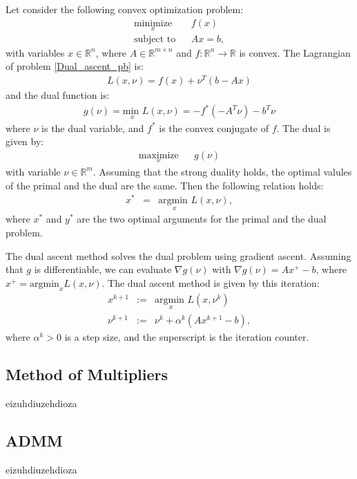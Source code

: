 \documentclass{article}
\begin{document}
	Let consider the following convex optimization problem:
\begin{eqnarray}
\label{Dual_ascent_pb}
\underset{x}{\text{minimize}} & & f(x) \\
\text{subject to} & & Ax = b, \nonumber
\end{eqnarray}
with variables $x \in \mathbb{R}^n$, where $A \in \mathbb{R}^{m \times n}$ and $ f : \mathbb{R}^n \to \mathbb{R}$ is convex. 
The Lagrangian of problem \ref{Dual_ascent_pb} is:
\begin{eqnarray*}
\label{Dual_ascent_Lag}
L(x,\nu) = f(x) + \nu^T (b - Ax)
\end{eqnarray*}
and the dual function is:
\begin{eqnarray*}
g(\nu) = \underset{x}{\text{min }} L(x, \nu) = - f^{*}(-A^T \nu) - b^T \nu
\end{eqnarray*}
where $\nu $ is the dual variable, and $f^*$ is the convex conjugate of $f$. The dual is given by:
\begin{eqnarray*}
\underset{\nu}{\text{maximize}} & & g(\nu)
\end{eqnarray*}
with variable $\nu \in \mathbb{R}^m$. Assuming that the strong duality holds, the optimal valules of the primal and the dual are the same. Then the following relation holds:
\begin{eqnarray*}
x^* &=& \underset{x}{\text{argmin }} L(x, \nu),
\end{eqnarray*}
where $x^*$ and $y^*$ are the two optimal arguments for the primal and the dual problem.

The dual ascent method solves the dual problem using gradient ascent. Assuming that $g$ is differentiable, we can evaluate $\nabla g(\nu)$ with $\nabla g(\nu) = Ax^+ - b$, where $x^+ = \text{argmin}_x L(x, \nu)$. The dual ascent method is given by this iteration:
\begin{eqnarray*}
x^{k+1} &:=& \underset{x}{\text{argmin }} L(x, \nu^k) \\
\nu^{k+1} &:=& \nu^k + \alpha^k (A x^{k+1} - b),
\end{eqnarray*}
where $\alpha^k > 0$ is a step size, and the superscript is the iteration counter.

\subsection{Method of Multipliers}
	\label{Method of Multipliers}
	
	eizuhdiuzehdioza

\subsection{ADMM}
	\label{ADMM}
	
	eizuhdiuzehdioza

 
 

\clearpage
\end{document}
